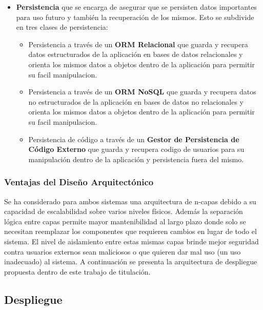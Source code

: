 \begin{itemize}
\begin{itemize}
    \end{itemize}
	\item \textbf{Persistencia} que se encarga de asegurar que se persisten datos importantes para uso futuro y también la recuperación de los mismos. Esto se subdivide en tres clases de persistencia:
    \begin{itemize}
    	\item Persistencia a través de un \textbf{ORM Relacional} que guarda y recupera datos estructurados de la aplicación en bases de datos relacionales y orienta los mismos datos a objetos dentro de la aplicación para permitir su facil manipulacion.
		\item Persistencia a través de un \textbf{ORM NoSQL} que guarda y recupera datos no estructurados de la aplicación en bases de datos no relacionales y orienta los mismos datos a objetos dentro de la aplicación para permitir su facil manipulacion.
		\item Persistencia de código a través de un \textbf{Gestor de Persistencia de Código Externo} que guarda y recupera codigo de usuarios para su manipulación dentro de la aplicación y persistencia fuera del mismo.
    \end{itemize}
\end{itemize}

\subsubsection{Ventajas del Diseño Arquitectónico}
Se ha considerado para ambos sistemas una arquitectura de n-capas debido a su capacidad de escalabilidad sobre varios niveles físicos. Además la separación lógica entre capas permite mayor mantenibilidad al largo plazo donde solo se necesitan reemplazar los componentes que requieren cambios en lugar de todo el sistema. El nivel de aislamiento entre estas mismas capas brinde mejor seguridad contra usuarios externos sean maliciosos o que quieren dar mal uso (un uso inadecuado) al sistema. A continuación se presenta la arquitectura de despliegue propuesta dentro de este trabajo de titulación.

\subsection{Despliegue}

